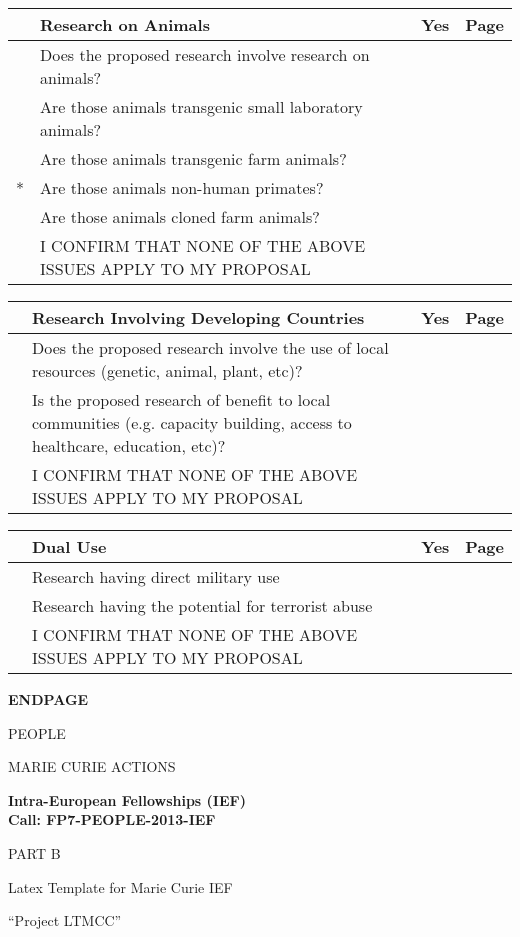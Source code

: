 \documentclass[a4paper,11pt]{article}
\newcommand{\projectname}[0]{Project LTMCC\xspace}
\newcommand{\mytitle}{Latex Template for Marie Curie IEF}
\newcommand{\cover}[1]{%
\newpage
\begin{center}
\vspace{4cm}
\textbf{#1}
\vspace{4cm}

PEOPLE

MARIE CURIE ACTIONS

\vspace{1cm}

\textbf{Intra-European Fellowships (IEF)}\\
\textbf{Call: FP7-PEOPLE-2013-IEF}

\vspace{4cm}

\Large{PART B}
\vspace{2cm}

\Huge{\mytitle}

\vspace{1cm}

\Large{``\projectname''}

\end{center}
\newpage
}
\begin{document}
\vspace{0.5cm}
\begin{tabularx}{\linewidth}{ | c | X | c | c | }
\rowcolor{black} & {\centering\arraybackslash \color{white} \bf Research on Animals} & {\color{white} \bf Yes} & {\color{white} \bf Page} \\ \hline
   & Does the proposed research involve research on animals?      & & \\ \hline
   & Are those animals transgenic small laboratory animals?       & & \\ \hline
   & Are those animals transgenic farm animals?                   & & \\ \hline
 * & Are those animals non-human primates?                        & & \\ \hline
   & Are those animals cloned farm animals?                       & & \\ \hline
   & I CONFIRM THAT NONE OF THE ABOVE ISSUES APPLY TO MY PROPOSAL & & \cellcolor[gray]{0.8}\\ \hline
\end{tabularx}

\vspace{0.5cm}
\begin{tabularx}{\linewidth}{ | c | X | c | c | }
\rowcolor{black} & {\centering\arraybackslash \color{white} \bf Research Involving Developing Countries} & {\color{white} \bf Yes} & {\color{white} \bf Page} \\ \hline
   & Does the proposed research involve the use of local resources (genetic, animal, plant, etc)?                             & & \\ \hline
   & Is the proposed research of benefit to local communities (e.g. capacity building, access to healthcare, education, etc)? & & \\ \hline
   & I CONFIRM THAT NONE OF THE ABOVE ISSUES APPLY TO MY PROPOSAL                                                             & & \cellcolor[gray]{0.8}\\ \hline
\end{tabularx}

\vspace{0.5cm}
\begin{tabularx}{\linewidth}{ | c | X | c | c | }
\rowcolor{black} & {\centering\arraybackslash \color{white} \bf Dual Use} & {\color{white} \bf Yes} & {\color{white} \bf Page} \\ \hline
   & Research having direct military use                          & & \\ \hline
   & Research having the potential for terrorist abuse            & & \\ \hline
   & I CONFIRM THAT NONE OF THE ABOVE ISSUES APPLY TO MY PROPOSAL & & \cellcolor[gray]{0.8}\\ \hline
\end{tabularx}



\cover{ENDPAGE}
\end{document}
